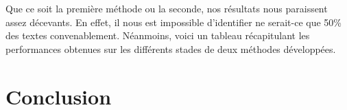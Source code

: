 \documentclass[a4paper,12pt]{report}
\begin{document}
Que ce soit la première méthode ou la seconde, nos résultats nous paraissent assez décevants. En effet, il nous est impossible d'identifier ne serait-ce que 50\% des textes convenablement. Néanmoins, voici un tableau récapitulant les performances obtenues sur les différents stades de deux méthodes développées.





\section*{Conclusion}

\end{document}
